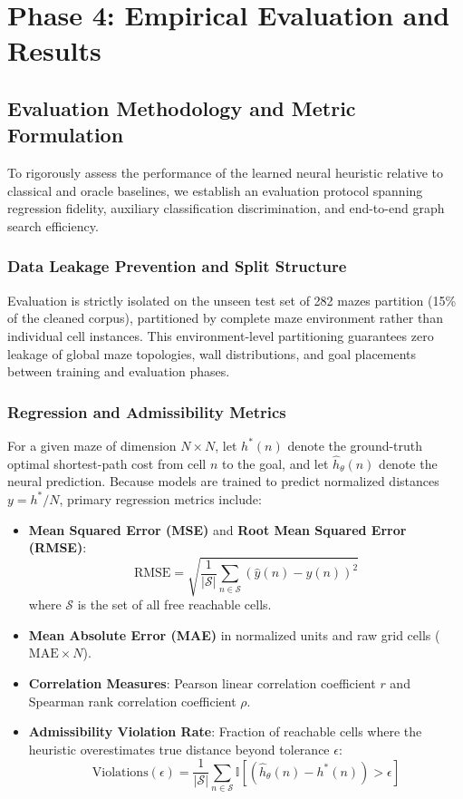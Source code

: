 \documentclass[11pt]{article}
\begin{document}
\section{Phase 4: Empirical Evaluation and Results}

\subsection{Evaluation Methodology and Metric Formulation}
To rigorously assess the performance of the learned neural heuristic relative to classical
and oracle baselines, we establish an evaluation protocol spanning regression fidelity, auxiliary
classification discrimination, and end-to-end graph search efficiency.

\subsubsection{Data Leakage Prevention and Split Structure}
Evaluation is strictly isolated on the unseen test set of 282 mazes partition (15\% of
the cleaned corpus), partitioned by complete maze environment rather than individual cell
instances. This environment-level partitioning guarantees zero leakage of global maze
topologies, wall distributions, and goal placements between training and evaluation phases.

\subsubsection{Regression and Admissibility Metrics}
For a given maze of dimension $N \times N$, let $h^\ast(n)$ denote the ground-truth optimal
shortest-path cost from cell $n$ to the goal, and let $\hat{h}_\theta(n)$ denote the
neural prediction. Because models are trained to predict normalized distances $y = h^\ast / N$,
primary regression metrics include:
\begin{itemize}
    \item \textbf{Mean Squared Error (MSE)} and \textbf{Root Mean Squared Error (RMSE)}:
    \begin{equation}
        \text{RMSE} = \sqrt{\frac{1}{|\mathcal{S}|} \sum_{n \in \mathcal{S}} \left(\hat{y}(n) - y(n)\right)^2}
    \end{equation}
    where $\mathcal{S}$ is the set of all free reachable cells.
    \item \textbf{Mean Absolute Error (MAE)} in normalized units and raw grid cells ($\text{MAE} \times N$).
    \item \textbf{Correlation Measures}: Pearson linear correlation coefficient $r$ and Spearman rank correlation coefficient $\rho$.
    \item \textbf{Admissibility Violation Rate}: Fraction of reachable cells where the heuristic overestimates true distance beyond tolerance $\epsilon$:
    \begin{equation}
        \text{Violations}(\epsilon) = \frac{1}{|\mathcal{S}|} \sum_{n \in \mathcal{S}} \mathbb{I}\left[(\hat{h}_\theta(n) - h^\ast(n)) > \epsilon\right]
    \end{equation}
\end{itemize}
\end{document}
